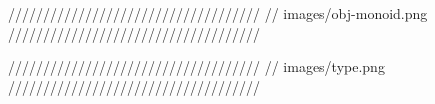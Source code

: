 
////////////////////////////////////
// images/obj-monoid.png 
////////////////////////////////////


////////////////////////////////////
// images/type.png 
////////////////////////////////////



